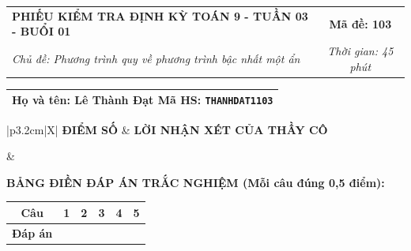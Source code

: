 \documentclass[12pt,a4paper]{article}
\begin{document}
\newpage


\noindent
\begin{tabularx}{\linewidth}{|X|c|}
\hline
\textbf{PHIẾU KIỂM TRA ĐỊNH KỲ TOÁN 9 - TUẦN 03 - BUỔI 01} & \textbf{Mã đề: 103} \\
\textit{Chủ đề: Phương trình quy về phương trình bậc nhất một ẩn} & \textit{Thời gian: 45 phút} \\
\hline
\end{tabularx}

\vspace{1mm}

\noindent
\begin{tabularx}{\linewidth}{|X|}
\hline
\rule[-2mm]{0pt}{7.5mm}\textbf{Họ và tên:} \textbf{\large Lê Thành Đạt} \hfill \textbf{Mã HS:} \texttt{THANHDAT1103} \quad \\
\hline
\end{tabularx}

\vspace{1mm}

\noindent
\begin{tabularx}{\linewidth}{|p{3.2cm}|X|}
\hline
\centering\textbf{ĐIỂM SỐ} & \centering\textbf{LỜI NHẬN XÉT CỦA THẦY CÔ} \tabularnewline
\hline
\rule{0pt}{1.3cm} & \tabularnewline
\hline
\end{tabularx}

\vspace{1.2mm}

\noindent\textbf{BẢNG ĐIỀN ĐÁP ÁN TRẮC NGHIỆM (Mỗi câu đúng 0,5 điểm):}
\vspace{0.8mm}

\noindent
\renewcommand{\arraystretch}{1.35}
\begin{tabularx}{\linewidth}{|c|*{5}{>{\centering\arraybackslash}X|}}
\hline
\textbf{Câu} & \textbf{1} & \textbf{2} & \textbf{3} & \textbf{4} & \textbf{5} \\
\hline
\textbf{Đáp án} & & & & & \\
\hline
\end{tabularx}
\renewcommand{\arraystretch}{1.0}

\vspace{1.5mm}
\end{document}
